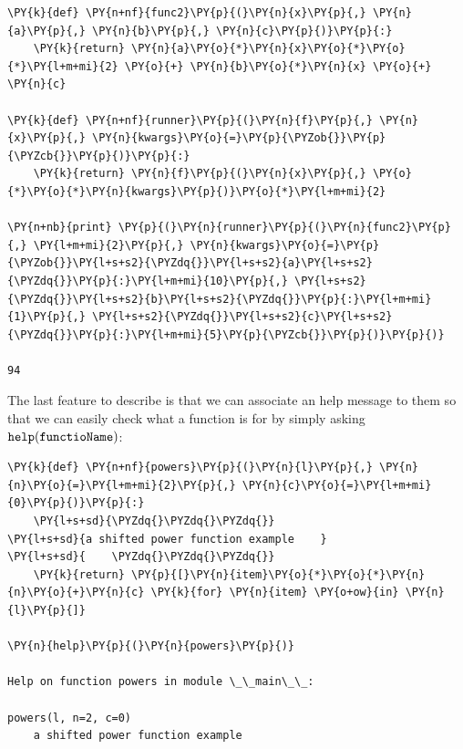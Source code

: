 \begin{tcolorbox}[breakable, size=fbox, boxrule=1pt, pad at break*=1mm,colback=cellbackground, colframe=cellborder]
\begin{Verbatim}[commandchars=\\\{\}]
\PY{k}{def} \PY{n+nf}{func2}\PY{p}{(}\PY{n}{x}\PY{p}{,} \PY{n}{a}\PY{p}{,} \PY{n}{b}\PY{p}{,} \PY{n}{c}\PY{p}{)}\PY{p}{:}
    \PY{k}{return} \PY{n}{a}\PY{o}{*}\PY{n}{x}\PY{o}{*}\PY{o}{*}\PY{l+m+mi}{2} \PY{o}{+} \PY{n}{b}\PY{o}{*}\PY{n}{x} \PY{o}{+} \PY{n}{c}
 		
\PY{k}{def} \PY{n+nf}{runner}\PY{p}{(}\PY{n}{f}\PY{p}{,} \PY{n}{x}\PY{p}{,} \PY{n}{kwargs}\PY{o}{=}\PY{p}{\PYZob{}}\PY{p}{\PYZcb{}}\PY{p}{)}\PY{p}{:}
    \PY{k}{return} \PY{n}{f}\PY{p}{(}\PY{n}{x}\PY{p}{,} \PY{o}{*}\PY{o}{*}\PY{n}{kwargs}\PY{p}{)}\PY{o}{*}\PY{l+m+mi}{2}
 		
\PY{n+nb}{print} \PY{p}{(}\PY{n}{runner}\PY{p}{(}\PY{n}{func2}\PY{p}{,} \PY{l+m+mi}{2}\PY{p}{,} \PY{n}{kwargs}\PY{o}{=}\PY{p}{\PYZob{}}\PY{l+s+s2}{\PYZdq{}}\PY{l+s+s2}{a}\PY{l+s+s2}{\PYZdq{}}\PY{p}{:}\PY{l+m+mi}{10}\PY{p}{,} \PY{l+s+s2}{\PYZdq{}}\PY{l+s+s2}{b}\PY{l+s+s2}{\PYZdq{}}\PY{p}{:}\PY{l+m+mi}{1}\PY{p}{,} \PY{l+s+s2}{\PYZdq{}}\PY{l+s+s2}{c}\PY{l+s+s2}{\PYZdq{}}\PY{p}{:}\PY{l+m+mi}{5}\PY{p}{\PYZcb{}}\PY{p}{)}\PY{p}{)}
 
94
\end{Verbatim}
\end{tcolorbox}
  
The last feature to describe is that we can associate an help message to them so that we can easily check what a function is for by simply asking $\tt{help(functioName)}$:

\begin{tcolorbox}[breakable, size=fbox, boxrule=1pt, pad at break*=1mm,colback=cellbackground, colframe=cellborder]
\begin{Verbatim}[commandchars=\\\{\}]
\PY{k}{def} \PY{n+nf}{powers}\PY{p}{(}\PY{n}{l}\PY{p}{,} \PY{n}{n}\PY{o}{=}\PY{l+m+mi}{2}\PY{p}{,} \PY{n}{c}\PY{o}{=}\PY{l+m+mi}{0}\PY{p}{)}\PY{p}{:}
    \PY{l+s+sd}{\PYZdq{}\PYZdq{}\PYZdq{}}
\PY{l+s+sd}{a shifted power function example    }
\PY{l+s+sd}{    \PYZdq{}\PYZdq{}\PYZdq{}}
    \PY{k}{return} \PY{p}{[}\PY{n}{item}\PY{o}{*}\PY{o}{*}\PY{n}{n}\PY{o}{+}\PY{n}{c} \PY{k}{for} \PY{n}{item} \PY{o+ow}{in} \PY{n}{l}\PY{p}{]}

\PY{n}{help}\PY{p}{(}\PY{n}{powers}\PY{p}{)}

Help on function powers in module \_\_main\_\_:

powers(l, n=2, c=0)
    a shifted power function example
\end{Verbatim}
\end{tcolorbox}

